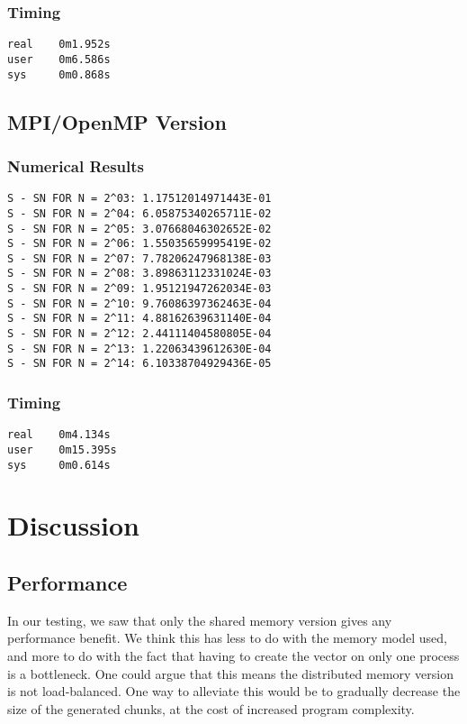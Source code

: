 \documentclass[a4paper, 12pt]{article}
\begin{document}
        \subsubsection{Timing} %
\begin{verbatim}
real    0m1.952s
user    0m6.586s
sys     0m0.868s
\end{verbatim}        

    \subsection{MPI/OpenMP Version} %
        \subsubsection{Numerical Results} %
        \begin{verbatim}
S - SN FOR N = 2^03: 1.17512014971443E-01
S - SN FOR N = 2^04: 6.05875340265711E-02
S - SN FOR N = 2^05: 3.07668046302652E-02
S - SN FOR N = 2^06: 1.55035659995419E-02
S - SN FOR N = 2^07: 7.78206247968138E-03
S - SN FOR N = 2^08: 3.89863112331024E-03
S - SN FOR N = 2^09: 1.95121947262034E-03
S - SN FOR N = 2^10: 9.76086397362463E-04
S - SN FOR N = 2^11: 4.88162639631140E-04
S - SN FOR N = 2^12: 2.44111404580805E-04
S - SN FOR N = 2^13: 1.22063439612630E-04
S - SN FOR N = 2^14: 6.10338704929436E-05
        \end{verbatim}
        \subsubsection{Timing} %
\begin{verbatim}
real    0m4.134s
user    0m15.395s
sys     0m0.614s
\end{verbatim}        

\section{Discussion} %
\label{sec:discussion}
    \subsection{Performance}
    In our testing, we saw that only the shared memory version gives any performance benefit. We think this has less to do with the memory model used, and more to do with the fact that having to create the vector on only one process is a bottleneck. One could argue that this means the distributed memory version is not load-balanced. One way to alleviate this would be to gradually decrease the size of the generated chunks, at the cost of increased program complexity.
\end{document}
